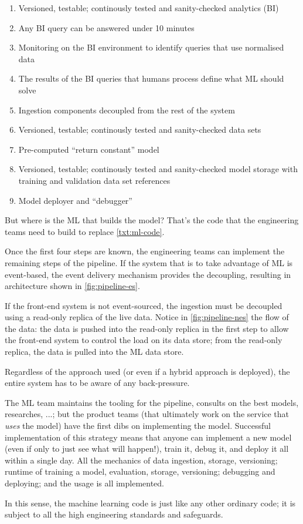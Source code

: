 \begin{enumerate}
  \item Versioned, testable; continously tested and sanity-checked analytics (BI)  
  \item Any BI query can be answered under 10 minutes
  \item Monitoring on the BI environment to identify queries that use normalised data
  \item The results of the BI queries that humans process define what ML should solve
  \item Ingestion components decoupled from the rest of the system
  \item Versioned, testable; continously tested and sanity-checked data sets 
  \label{txt:ml-code}\item Pre-computed ``return constant'' model
  \item Versioned, testable; continously tested and sanity-checked model storage with training and validation data set references
  \item Model deployer and ``debugger''
\end{enumerate}

But where is the ML that builds the model? That's the code that the engineering teams need to build to replace \autoref{txt:ml-code}. 

Once the first four steps are known, the engineering teams can implement the remaining steps of the pipeline. If the system that is to take advantage of ML is event-based, the event delivery mechanism provides the decoupling, resulting in architecture shown in \autoref{fig:pipeline-es}.


If the front-end system is not event-sourced, the ingestion must be decoupled using a read-only replica of the live data. Notice in \autoref{fig:pipeline-nes} the flow of the data: the data is pushed into the read-only replica in the first step to allow the front-end system to control the load on its data store; from the read-only replica, the data is pulled into the ML data store. 


Regardless of the approach used (or even if a hybrid approach is deployed), the entire system has to be aware of any back-pressure.

The ML team maintains the tooling for the pipeline, consults on the best models, researches, ...; but the product teams (that ultimately work on the service that \emph{uses} the model) have the first dibs on implementing the model. Successful implementation of this strategy means that anyone can implement a new model (even if only to just see what will happen!), train it, debug it, and deploy it all within a single day. All the mechanics of data ingestion, storage, versioning; runtime of training a model, evaluation, storage, versioning; debugging and deploying; and the usage is all implemented. 

In this sense, the machine learning code is just like any other ordinary code; it is subject to all the high engineering standards and safeguards.


